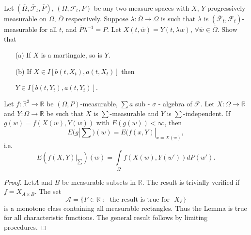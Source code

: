 \begin{exer*}
Let $(\overline{\Omega},\overline{\mathscr{F}}_{t},\overline{P})$,
$(\Omega,\mathscr{F}_{t},P)$ be any two measure spaces with $X$, $Y$
progressively measurable on $\Omega$, $\overline{\Omega}$
respectively. Suppose $\lambda:\overline{\Omega}\to \Omega$ is such
that $\lambda$ is
$(\overline{\mathscr{F}}_{t},\mathscr{F}_{t})$-measurable for all $t$,
and $\overline{P}\lambda^{-1}=P$. Let $X(t,\overline{w})=Y(t,\lambda
w)$, $\forall \overline{w}\in \overline{\Omega}$. Show that
\begin{itemize}
\item[(a)] If $X$ is a martingale, so is $Y$.

\item[(b)] If $X\in I[b(t,X_{t}),a(t,X_{t})]$ then

$Y\in I[b(t,Y_{t}),a(t,Y_{t})]$.
\end{itemize}
\end{exer*}

\begin{lemma*}
Let $f:\mathbb{R}^{2}\to \mathbb{R}$ be $(\Omega,P)$-measurable, $\sum
a$ sub - $\sigma$ - algebra of $\mathscr{F}$. Let $X:\Omega\to
\mathbb{R}$ and $Y:\Omega\to \mathbb{R}$ be such that $X$ is
$\sum$-measurable and $Y$ is $\sum$-independent. If
$g(w)=f(X(w),Y(w))$ with $E(g(w))<\infty$, then
$$
E(g|\sum)(w)=E(f(x,Y)|_{x=X(w)},
$$
i.e.
$$
E(f(X,Y)|_{\sum})(w)=\int\limits_{\Omega}f(X(w),Y(w'))dP(w').
$$
\end{lemma*}

\begin{proof}
Let\pageoriginale $A$ and $B$ be measurable subsets in
$\mathbb{R}$. The result is trivially verified if $f=X_{A\times
  B}$. The set
$$
\mathscr{A}=\{F\in \mathbb{R}~:\text{~ the result is true for~ }
X_{F}\}
$$
is a monotone class containing all measurable rectangles. Thus the
Lemma is true for all characteristic functions. The general result
follows by limiting procedures.
\end{proof}

